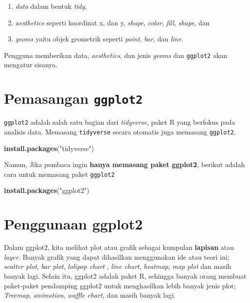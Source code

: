 \documentclass[]{book}
\newenvironment{Shaded}{\begin{snugshade}}{\end{snugshade}}
\newcommand{\KeywordTok}[1]{\textcolor[rgb]{0.13,0.29,0.53}{\textbf{#1}}}
\newcommand{\StringTok}[1]{\textcolor[rgb]{0.31,0.60,0.02}{#1}}
\newcommand{\NormalTok}[1]{#1}
\providecommand{\tightlist}{%
  \setlength{\itemsep}{0pt}\setlength{\parskip}{0pt}}
\begin{document}
\begin{enumerate}
\def\labelenumi{\arabic{enumi}.}
\tightlist
\item
  \emph{data} dalam bentuk \emph{tidy},
\item
  \emph{aesthetics} seperti koordinat x, dan y, \emph{shape},
  \emph{color}, \emph{fill}, \emph{shape}, dan
\item
  \emph{geoms} yaitu objek geometrik seperti \emph{point}, \emph{bar},
  dan \emph{line}.
\end{enumerate}

Pengguna memberikan data, \emph{aesthetics}, dan jenis \emph{geoms} dan
\texttt{ggplot2} akan mengatur sisanya.

\section{\texorpdfstring{Pemasangan
\texttt{ggplot2}}{Pemasangan ggplot2}}\label{pemasangan-ggplot2}

\texttt{ggplot2} adalah salah satu bagian dari \emph{tidyverse}, paket R
yang berfokus pada analisis data. Memasang \texttt{tidyverse} secara
otomatis juga memasang \texttt{ggplot2}.

\begin{Shaded}
\begin{Highlighting}[]
\KeywordTok{install.packages}\NormalTok{(}\StringTok{"tidyverse"}\NormalTok{)}
\end{Highlighting}
\end{Shaded}

Namun, Jika pembaca ingin \textbf{hanya memasang paket ggplot2}, berikut
adalah cara untuk memasang paket \texttt{ggplot2}

\begin{Shaded}
\begin{Highlighting}[]
\KeywordTok{install.packages}\NormalTok{(}\StringTok{"ggplot2"}\NormalTok{)}
\end{Highlighting}
\end{Shaded}

\section{Penggunaan ggplot2}\label{penggunaan-ggplot2}

Dalam ggplot2, kita melihat plot atau grafik sebagai kumpulan
\textbf{lapisan} atau \emph{layer}. Banyak grafik yang dapat dihasilkan
menggunakan ide atau teori ini; \emph{scatter plot}, \emph{bar plot},
\emph{lolipop chart }, \emph{line chart}, \emph{heatmap}, \emph{map
plot} dan masih banyak lagi. Selain itu, ggplot2 adalah paket R,
sehingga banyak orang membuat paket-paket pendamping ggplot2 untuk
menghasilkan lebih banyak jenis plot; \emph{Treemap}, \emph{animation},
\emph{waffle chart}, dan masih banyak lagi.
\end{document}
